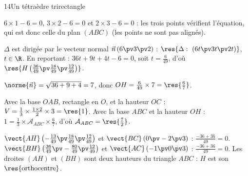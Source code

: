 \begin{corrige}{14}{Un tétraèdre trirectangle}
\begin{questions}
  \item $6\times1-6=0$, $3\times2-6=0$ et $2\times3-6=0$ : les trois points vérifient l'équation, qui est donc celle du plan $(ABC)$
    (les points ne sont pas alignés).
  \item $\Delta$ est dirigée par le vecteur normal $\vec n\,(6\pv3\pv2)$ : $\res{\Delta:\ (6t\pv3t\pv2t)}$, $t\in\R$. En reportant :
    $36t+9t+4t-6=0$, soit $t=\frac{6}{49}$, d'où $\res{H\left(\tfrac{36}{49}\pv\tfrac{18}{49}\pv\tfrac{12}{49}\right)}$.
  \item $\norme{\vec n}=\sqrt{36+9+4}=7$, donc $OH=\frac{6}{49}\times7=\res{\tfrac67}$.
  \item Avec la base $OAB$, rectangle en $O$, et la hauteur $OC$ : $V=\frac13\times\frac{1\times2}{2}\times3=\res{1}$. Avec la base $ABC$
    et la hauteur $OH$ : $1=\frac13\times\mathcal{A}_{ABC}\times\frac67$, d'où $\mathcal{A}_{ABC}=\res{\tfrac72}$.
  \item $\vect{AH}\left(-\frac{13}{49}\pv\frac{18}{49}\pv\frac{12}{49}\right)$ et $\vect{BC}\,(0\pv-2\pv3)$ : $\frac{-36+36}{49}=0$.
    $\vect{BH}\left(\frac{36}{49}\pv-\frac{80}{49}\pv\frac{12}{49}\right)$ et $\vect{AC}\,(-1\pv0\pv3)$ : $\frac{-36+36}{49}=0$. Les droites
    $(AH)$ et $(BH)$ sont deux hauteurs du triangle $ABC$ : $H$ est son $\res{\text{orthocentre}}$.
\end{questions}
\end{corrige}

